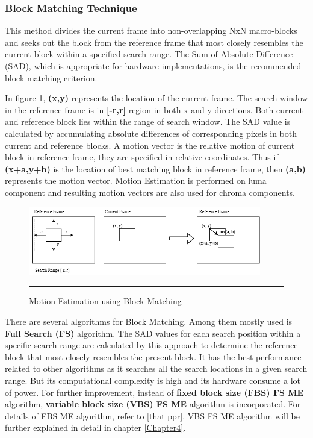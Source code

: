 \subsubsection{Block Matching Technique}
This method divides the current frame into non-overlapping NxN macro-blocks and seeks out the block from the reference frame that most closely resembles the current block within a specified search range. The Sum of Absolute Difference (SAD), which is appropriate for hardware implementations, is the recommended block matching criterion.

In figure \ref{fig:mv}, \textbf{(x,y)} represents the location of the current frame. The search window in the reference frame is in \textbf{[-r,r]} region in both x and y directions. Both current and reference block lies within the range of search window. The SAD value is calculated by accumulating absolute differences of corresponding pixels in both current and reference blocks. A motion vector is the relative motion of current block in reference frame, they are specified in relative coordinates. Thus if \textbf{(x+a,y+b)} is the location of best matching block in reference frame, then \textbf{(a,b)} represents the motion vector. Motion Estimation is performed on luma component and resulting motion vectors are also used for chroma components.

\begin{figure}[htbp]
	\centering
	\includegraphics[width = 4in]{./Figures/mv.png}
	\rule{35em}{0.5pt}
	\caption{Motion Estimation using Block Matching}
	\label{fig:mv}
\end{figure}

There are several algorithms for Block Matching. Among them mostly used is \textbf{Full Search (FS)} algorithm. The SAD values for each search position within a specific search range are calculated by this approach to determine the reference block that most closely resembles the present block. It has the best performance related to other algorithms as it searches all the search locations in a given search range. But its computational complexity is high and its hardware consume a lot of power. For further improvement, instead of \textbf{fixed block size (FBS) FS ME} algorithm, \textbf{variable block size (VBS) FS ME} algorithm is incorporated. For details of FBS ME algorithm, refer to [that ppr]. VBS FS ME algorithm will be further explained in detail in chapter \ref{Chapter4}.


